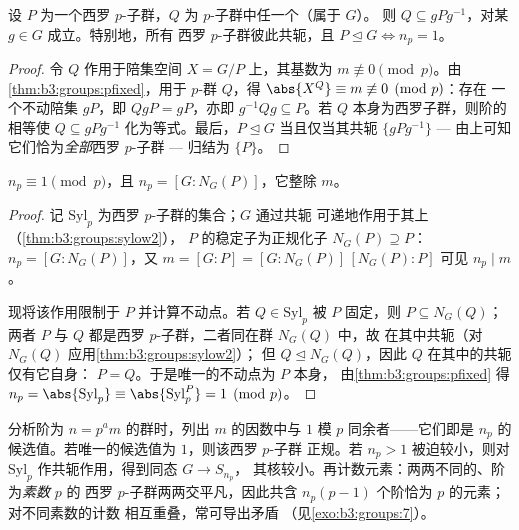 \begin{theorem}[西罗 II：支配与共轭]\label{thm:b3:groups:sylow2}
设 $P$ 为一个西罗 $p$-子群，$Q$ 为 $p$-子群中任一个（属于 $G$）。
则 $Q \subseteq gPg^{-1}$，对某 $g \in G$ 成立。特别地，所有
西罗 $p$-子群彼此共轭，且 $P \trianglelefteq G \iff
n_p = 1$。
\end{theorem}

\begin{proof}
令 $Q$ 作用于陪集空间 $X = G/P$ 上，其基数为 $m
\not\equiv 0 \pmod p$。由\cref{thm:b3:groups:pfixed}，用于
$p$-群 $Q$，得 $\abs{X^Q} \equiv m \not\equiv 0 \pmod p$：存在
一个不动陪集 $gP$，即 $QgP = gP$，亦即 $g^{-1}Qg \subseteq
P$。若 $Q$ 本身为西罗子群，则阶的相等使
$Q \subseteq gPg^{-1}$ 化为等式。最后，$P
\trianglelefteq G$ 当且仅当其共轭 $\{gPg^{-1}\}$ ---
由上可知它们恰为\emph{全部}西罗 $p$-子群 --- 归结为
$\{P\}$。
\end{proof}

\begin{theorem}[西罗第三定理：计数]\label{thm:b3:groups:sylow3}
$n_p \equiv 1 \pmod p$，且 $n_p = [G : N_G(P)]$，它整除
$m$。
\end{theorem}

\begin{proof}
记 $\mathrm{Syl}_p$ 为西罗 $p$-子群的集合；$G$ 通过共轭
可递地作用于其上（\cref{thm:b3:groups:sylow2}），
$P$ 的稳定子为正规化子 $N_G(P) \supseteq P$：$n_p = [G :
N_G(P)]$，又 $m = [G:P] = [G:N_G(P)]\,[N_G(P):P]$ 可见 $n_p \mid
m$。

现将该作用限制于 $P$ 并计算不动点。若 $Q \in
\mathrm{Syl}_p$ 被 $P$ 固定，则 $P \subseteq N_G(Q)$；两者
$P$ 与 $Q$ 都是西罗 $p$-子群，二者同在群 $N_G(Q)$ 中，故
在其中共轭（对 $N_G(Q)$ 应用\cref{thm:b3:groups:sylow2}）；
但 $Q \trianglelefteq N_G(Q)$，因此 $Q$ 在其中的共轭仅有它自身：
$P = Q$。于是唯一的不动点为 $P$ 本身，
由\cref{thm:b3:groups:pfixed} 得 $n_p = \abs{\mathrm{Syl}_p}
\equiv \abs{\mathrm{Syl}_p^P} = 1 \pmod p$。
\end{proof}

\begin{method}\label{met:b3:groups:sylowmethod}
分析阶为 $n = p^a m$ 的群时，列出
$m$ 的因数中与 $1$ 模 $p$ 同余者——它们即是
$n_p$ 的候选值。若唯一的候选值为 $1$，则该西罗 $p$-子群
正规。若 $n_p > 1$ 被迫较小，则对
$\mathrm{Syl}_p$ 作共轭作用，得到同态 $G \to S_{n_p}$，
其核较小。再计数元素：两两不同的、阶为\emph{素数} $p$ 的
西罗 $p$-子群两两交平凡，因此共含
$n_p(p-1)$ 个阶恰为 $p$ 的元素；对不同素数的计数
相互重叠，常可导出矛盾
（见\cref{exo:b3:groups:7}）。
\end{method}

